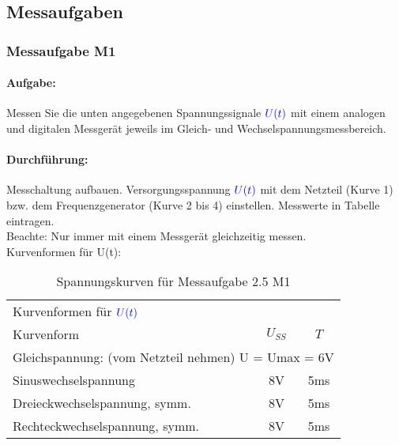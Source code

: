 \documentclass[11pt,a4paper,titlepage]{scrreprt}
\begin{document}
            \subsection{Messaufgaben}
            \subsubsection{Messaufgabe M1}
            \paragraph{Aufgabe:} Messen Sie die unten angegebenen Spannungssignale $\textcolor{blue}{U(t)}$ mit einem analogen und digitalen Messgerät jeweils im Gleich- und Wechselspannungsmessbereich.
            \paragraph{Durchführung:} Messchaltung aufbauen. Versorgungsspannung $\textcolor{blue}{U(t)}$ mit dem Netzteil (Kurve 1) bzw. dem Frequenzgenerator (Kurve 2 bis 4) einstellen. Messwerte in Tabelle eintragen.\\
            Beachte: Nur immer mit  einem   Messgerät gleichzeitig messen.\\
            
			\pagebreak			
			Kurvenformen für U(t):            
            \begin{center}
                \begin{table}[!hbtp]
                    \caption{Spannungskurven für Messaufgabe 2.5 M1}
                    \label{tbl:kurven2.1}
                    \renewcommand{\arraystretch}{1.3}
                    \begin{center}
                        \begin{tabular}{l|cc}
                            \multicolumn{3}{l}{Kurvenformen für $\textcolor{blue}{U(t)}$}\\
                            Kurvenform & $U_{SS}$ & $T$\\ \hline
                            \multicolumn{3}{l}{Gleichspannung: (vom Netzteil nehmen)      U =  Umax = 6V}   \\
                            Sinuswechselspannung & 8V & 5ms   \\
                            Dreieckwechselspannung, symm.& 8V & 5ms\\   
                            Rechteckwechselspannung, symm.& 8V &5ms \\
                        \end{tabular}
                    \end{center}
                \end{table}
            \end{center}            
             
\end{document}
